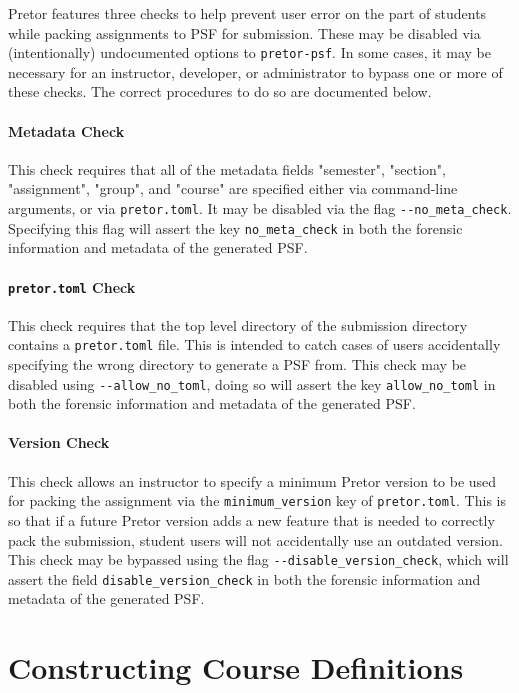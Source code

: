 \documentclass{book}
\begin{document}
Pretor features three checks to help prevent user error on the part of students
while packing assignments to PSF for submission. These may be disabled via
(intentionally) undocumented options to \texttt{pretor-psf}. In some cases, it
may be necessary for an instructor, developer, or administrator to bypass one
or more of these checks. The correct procedures to do so are documented below.

\paragraph{Metadata Check} This check requires that all of the metadata fields
"semester", "section", "assignment", "group", and "course" are specified either
via command-line arguments, or via \texttt{pretor.toml}. It may be disabled via
the flag \texttt{-{}-no\_meta\_check}. Specifying this flag will assert the key
\texttt{no\_meta\_check} in both the forensic information and metadata of the
generated PSF.

\paragraph{\texttt{pretor.toml} Check} This check requires that the top level
directory of the submission directory contains a \texttt{pretor.toml} file.
This is intended to catch cases of users accidentally specifying the wrong
directory to generate a PSF from. This check may be disabled using
\texttt{-{}-allow\_no\_toml}, doing so will assert the key
\texttt{allow\_no\_toml} in both the forensic information and metadata of the
generated PSF.

\paragraph{Version Check} This check allows an instructor to specify a minimum
Pretor version to be used for packing the assignment via the
\texttt{minimum\_version} key of \texttt{pretor.toml}. This is so that if a
future Pretor version adds a new feature that is needed to correctly pack the
submission, student users will not accidentally use an outdated version.  This
check may be bypassed using the flag \texttt{-{}-disable\_version\_check},
which will assert the field \texttt{disable\_version\_check} in both the
forensic information and metadata of the generated PSF.

\section{Constructing Course Definitions} \label{sec:course_definitions}
\end{document}
